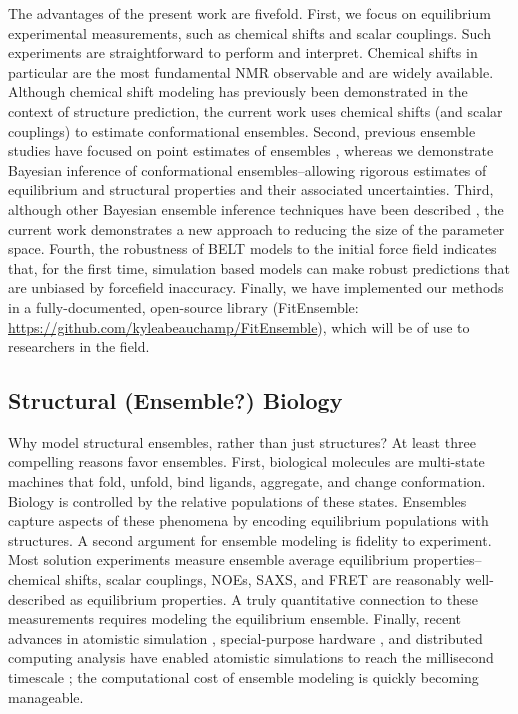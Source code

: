\documentclass[11pt,titlepage]{article}
\begin{document}
The advantages of the present work are fivefold.  First, we focus on equilibrium experimental measurements, such as chemical shifts and scalar couplings.  Such experiments are straightforward to perform and interpret.  Chemical shifts in particular are the most fundamental NMR observable and are widely available.  Although chemical shift modeling has previously been demonstrated \cite{shen2008consistent} in the context of structure prediction, the current work uses chemical shifts (and scalar couplings) to estimate conformational ensembles.  Second, previous ensemble studies have focused on point estimates of ensembles \cite{rozycki2011saxs, lindorff2005simultaneous, lange2008recognition}, whereas we demonstrate Bayesian inference of conformational ensembles--allowing rigorous estimates of equilibrium and structural properties and their associated uncertainties.  Third, although other Bayesian ensemble inference techniques have been described \cite{fisher2010}, the current work demonstrates a 
new approach to reducing the size of the parameter space.  Fourth, the robustness of BELT models to the initial force field indicates that, for the first time, simulation based models can make robust predictions that are unbiased by forcefield inaccuracy.  Finally, we have implemented our methods in a fully-documented, open-source library (FitEnsemble: \url{https://github.com/kyleabeauchamp/FitEnsemble}), which will be of use to researchers in the field.  

\subsection*{Structural (Ensemble?) Biology}

Why model structural ensembles, rather than just structures?  At least three compelling reasons favor ensembles.  First, biological molecules are multi-state machines that fold, unfold, bind ligands, aggregate, and change conformation.  Biology is controlled by the relative populations of these states.  Ensembles capture aspects of these phenomena by encoding equilibrium populations with structures.  A second argument for ensemble modeling is fidelity to experiment.  Most solution experiments measure ensemble average equilibrium properties--chemical shifts, scalar couplings, NOEs, SAXS, and FRET are reasonably well-described as equilibrium properties.  A truly quantitative connection to these measurements requires modeling the equilibrium ensemble.  Finally, recent advances in atomistic simulation  \citep{hess2008, pronk2013gromacs, eastman2012openmm, eastman2010openmm}, special-purpose hardware  \citep{Shaw2008}, and distributed computing analysis  \citep{emma, msmb2} have enabled atomistic simulations to 
reach the millisecond timescale  \citep{voelz2010, bowman2011atomistic, shaw2010, Shaw2011}; the computational cost of ensemble modeling is quickly becoming manageable.
\end{document}
